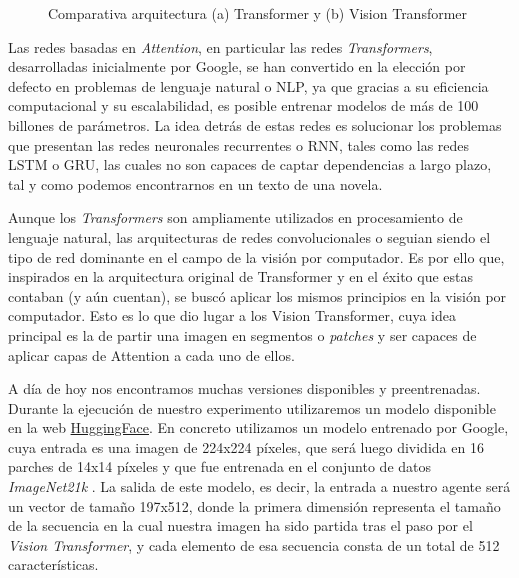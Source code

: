 \begin{figure}[H]
  \caption[Comparativa arquitectura (a) Transformer y (b) Vision Transformer]{Comparativa arquitectura (a) Transformer y (b) Vision Transformer}
  \label{fig-vision-transformer}
\end{figure}

Las redes basadas en \textit{Attention}, en particular las redes \textit{Transformers}, desarrolladas inicialmente por Google, se han convertido en la elección por defecto en problemas de lenguaje natural o NLP, ya que gracias a su eficiencia computacional y su escalabilidad, es posible entrenar modelos de más de 100 billones de parámetros. La idea detrás de estas redes es solucionar los problemas que presentan las redes neuronales recurrentes o RNN, tales como las redes LSTM o GRU, las cuales no son capaces de captar dependencias a largo plazo, tal y como podemos encontrarnos en un texto de una novela.
\medskip

Aunque los \textit{Transformers} son ampliamente utilizados en procesamiento de lenguaje natural, las arquitecturas de redes convolucionales o  seguian siendo el tipo de red dominante en el campo de la visión por computador. Es por ello que, inspirados en la arquitectura original de Transformer y en el éxito que estas contaban (y aún cuentan), se buscó aplicar los mismos principios en la visión por computador. Esto es lo que dio lugar a los Vision Transformer, cuya idea principal es la de partir una imagen en segmentos o \textit{patches} y ser capaces de aplicar capas de Attention a cada uno de ellos. 
\medskip

A día de hoy nos encontramos muchas versiones disponibles y preentrenadas. Durante la ejecución de nuestro experimento utilizaremos un modelo disponible en la web \href{https://huggingface.co/docs/transformers/model_doc/vit#transformers.ViTModel}{HuggingFace}. En concreto utilizamos un modelo entrenado por Google, cuya entrada es una imagen de 224x224 píxeles, que será luego dividida en 16 parches de 14x14 píxeles y que fue entrenada en el conjunto de datos \textit{ImageNet21k} \citep{imagenet21k}. La salida de este modelo, es decir, la entrada a nuestro agente será un vector de tamaño 197x512, donde la primera dimensión representa el tamaño de la secuencia en la cual nuestra imagen ha sido partida tras el paso por el \textit{Vision Transformer}, y cada elemento de esa secuencia consta de un total de 512 características.